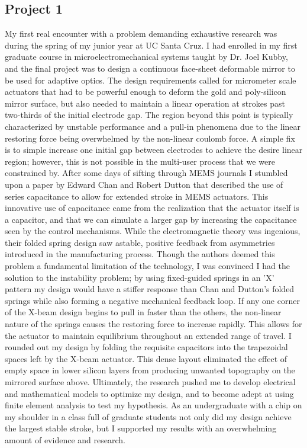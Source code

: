 \documentclass[journal, draftcls]{IEEEtran}
\begin{document}
\subsection{Project 1}
My first real encounter with a problem demanding exhaustive research was during the spring of my junior year at UC Santa Cruz. I had enrolled in my first graduate course in microelectromechanical systems taught by Dr. Joel Kubby, and the final project was to design a continuous face-sheet deformable mirror to be used for adaptive optics. The design requirements called for micrometer scale actuators that had to be powerful enough to deform the gold and poly-silicon mirror surface, but also needed to maintain a linear operation at strokes past two-thirds of the initial electrode gap. The region beyond this point is typically characterized by unstable performance and a pull-in phenomena due to the linear restoring force being overwhelmed by the non-linear coulomb force. A simple fix is to simple increase one initial gap between electrodes to achieve the desire linear region; however, this is not possible in the multi-user process that we were constrained by. After some days of sifting through MEMS journals I stumbled upon a paper by Edward Chan and Robert Dutton that described the use of series capacitance to allow for extended stroke in MEMS actuators. This innovative use of capacitance came from the realization that  the actuator itself is a capacitor, and that we can simulate a larger gap by increasing the capacitance seen by the control mechanisms. While the electromagnetic theory was ingenious, their folded spring design saw astable, positive feedback from asymmetries introduced in the manufacturing process. Though the authors deemed this problem a fundamental limitation of the technology, I was convinced I had the solution to the instability problem; by using fixed-guided springs in an 'X' pattern my design would have a stiffer response than Chan and Dutton's folded springs while also forming a negative mechanical feedback loop. If any one corner of the X-beam design begins to pull in faster than the others, the non-linear nature of the springs causes the restoring force to increase rapidly. This allows for the actuator to maintain equilibrium throughout an extended range of travel. 
I rounded out my design by folding the requisite capacitors into the trapezoidal spaces left by the X-beam actuator. This dense layout eliminated the effect of empty space in lower silicon layers from producing unwanted topography on the mirrored surface above. Ultimately, the research pushed me to develop electrical and mathematical models to optimize my design, and to become adept at using finite element analysis to test my hypothesis. As an undergraduate with a chip on my shoulder in a class full of graduate students not only did my design achieve the largest stable stroke, but I supported my results with an overwhelming amount of evidence and research.  
\end{document}

